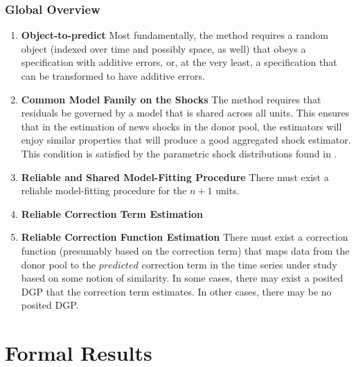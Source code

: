 \documentclass[9pt]{beamer}
\theoremstyle{definition}
\begin{document}
\begin{frame}\frametitle{Global Overview}

    \begin{enumerate}
        \item \textbf{Object-to-predict}
        Most fundamentally, the method requires a random object (indexed over time and possibly space, as well) that obeys a specification with additive errors, or, at the very least, a specification that can be transformed to have additive errors.  
            
      \item \textbf{Common Model Family on the Shocks} The method requires that residuals be governed by a model that is shared across all units.  This ensures that in the estimation of news shocks in the donor pool, the estimators will enjoy similar properties that will produce a good aggregated shock estimator.  This condition is satisfied by the parametric shock distributions found in \cite[][]{lin2021minimizing, lundquist2024volatility}.
      
      \item \textbf{Reliable and Shared Model-Fitting Procedure} There must exist a reliable model-fitting procedure for the $n+1$ units.
      
      \item \textbf{Reliable Correction Term Estimation} 

      \item \textbf{Reliable Correction Function Estimation} There must exist a correction function (presumably based on the correction term) that maps data from the donor pool to the $\textit{predicted}$ correction term in the time series under study based on some notion of similarity.  In some cases, there may exist a posited DGP that the correction term estimates.  In other cases, there may be no posited DGP.
    \end{enumerate}
\end{frame}

\section{Formal Results}
\end{document}

